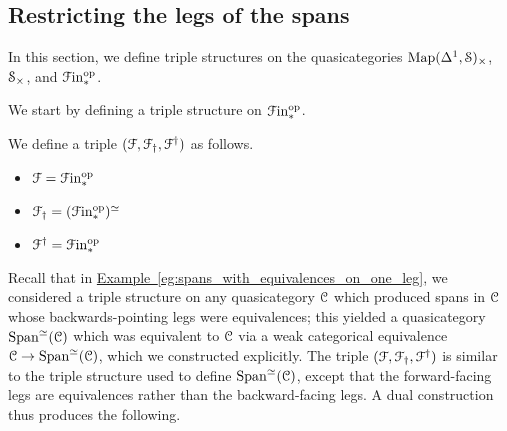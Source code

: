 \documentclass[main.tex]{subfiles}
\begin{document}
\subsection{Restricting the legs of the spans}
\label{ssc:restricting_the_legs_of_the_spans}

In this section, we define triple structures on the quasicategories $\Map(\Delta^{1}, \S)_{\times}$, $\S_{\times}$, and $\Finp\op$.

We start by defining a triple structure on $\Finp\op$.

\begin{definition}
  We define a triple $\triple{F}$ as follows.
  \begin{itemize}
    \item $\mathcal{F} = \Finp\op$

    \item $\mathcal{F}\downdag = (\Finp\op)^{\simeq}$

    \item $\mathcal{F}\updag = \Finp\op$
  \end{itemize}
\end{definition}

Recall that in \hyperref[eg:spans_with_equivalences_on_one_leg]{Example~\ref*{eg:spans_with_equivalences_on_one_leg}}, we considered a triple structure on any quasicategory $\category{C}$ which produced spans in $\category{C}$ whose backwards-pointing legs were equivalences; this yielded a quasicategory $\Span^{\simeq}(\category{C})$ which was equivalent to $\category{C}$ via a weak categorical equivalence $\category{C} \to \Span^{\simeq}(\category{C})$, which we constructed explicitly. The triple $\triple{F}$ is similar to the triple structure used to define $\Span^{\simeq}(\category{C})$, except that the forward-facing legs are equivalences rather than the backward-facing legs. A dual construction thus produces the following.
\end{document}
